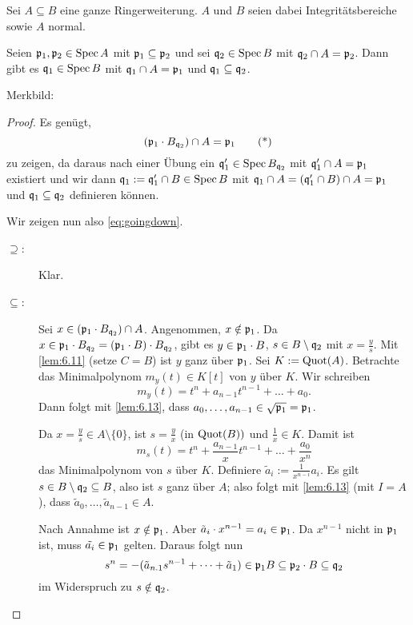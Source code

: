 \documentclass[12pt,a4paper]{scrartcl}
\theoremstyle{cplain}
\theoremstyle{cdef}
\begin{document}
\begin{satz} \label{thm:going down}
	Sei $A\subseteq B$ eine ganze Ringerweiterung. $A$ und $B$ seien dabei Integritätsbereiche sowie $A$ normal.
	
	Seien $\mathfrak{p}_1,\mathfrak{p}_2\in \operatorname{Spec} A$ mit $\mathfrak{p}_1\subseteq \mathfrak{p}_2$ und sei $\mathfrak{q}_2\in\operatorname{Spec} B$ mit $\mathfrak{q}_2\cap A = \mathfrak{p}_2$. Dann gibt es $\mathfrak{q}_1\in\operatorname{Spec} B$ mit $\mathfrak{q}_1\cap A = \mathfrak{p}_1$ und $\mathfrak{q}_1\subseteq \mathfrak{q}_2$.
	
	Merkbild:
	\begin{center}
	\end{center}
\end{satz}
\begin{proof}
	Es genügt, \begin{equation}(\mathfrak{p}_1\cdot B_{\mathfrak{q}_2})\cap A = \mathfrak{p}_1 \tag{*}\label{eq:goingdown}\end{equation} zu zeigen, da daraus nach einer Übung ein $\mathfrak{q}_1' \in \operatorname{Spec} B_{\mathfrak{q}_2}$ mit $\mathfrak{q}_1'\cap A = \mathfrak{p}_1$ existiert und wir dann $\mathfrak{q}_1 := \mathfrak{q}_1'\cap B\in\operatorname{Spec} B$ mit $\mathfrak{q}_1\cap A = (\mathfrak{q}_1'\cap B)\cap A = \mathfrak{p}_1$ und $\mathfrak{q}_1\subseteq \mathfrak{q}_2$ definieren können.
	
	Wir zeigen nun also \eqref{eq:goingdown}.
	\begin{description}
		\item[\glqq$\supseteq$\grqq:] Klar.
		\item[\glqq$\subseteq$\grqq:] Sei $x\in (\mathfrak{p}_1\cdot B_{\mathfrak{q}_2})\cap A$. Angenommen, $x\notin \mathfrak{p}_1$. Da $x\in \mathfrak{p}_1\cdot B_{\mathfrak{q}_2} = (\mathfrak{p}_1\cdot B)\cdot B_{\mathfrak{q}_2}$, gibt es $y\in \mathfrak{p}_1\cdot B$, $s\in B\setminus \mathfrak{q}_2$ mit $x = \frac ys$. Mit \cref{lem:6.11} (setze $C = B$) ist $y$ ganz über $\mathfrak{p}_1$. Sei $K := \operatorname{Quot}(A)$. Betrachte das Minimalpolynom $m_y(t) \in K[t]$ von $y$ über $K$. Wir schreiben 
		\[m_y(t) = t^n+a_{n-1}t^{n-1}+\dots+a_0.\]
		Dann folgt mit \cref{lem:6.13}, dass $a_0,\dots, a_{n-1}\in\sqrt{\mathfrak{p}_1} = \mathfrak{p}_1$.
		
		Da $x = \frac ys\in A\setminus\{0\}$, ist $s = \frac yx$ (in $\operatorname{Quot}(B))$ und $\frac 1x \in K$. Damit ist
		\[m_s(t) = t^n+\frac{a_{n-1}}xt^{n-1}+\dots + \frac {a_0}{x^n}\]
		das Minimalpolynom von $s$ über $K$. Definiere $\tilde{a}_i := \frac{1}{x^{n-i}}a_i$. Es gilt $s\in B\setminus \mathfrak{q}_2\subseteq B$, also ist $s$ ganz über $A$; also folgt mit \cref{lem:6.13} (mit $I = A$), dass $\tilde{a}_0,\dots, \tilde{a}_{n-1}\in A$.
		
		Nach Annahme ist $x\notin \mathfrak{p}_1$. Aber $\tilde{a}_i\cdot x^{n-1} = a_i\in \mathfrak{p}_1$. Da $x^{n-1}$ nicht in $\mathfrak{p}_1$ ist, muss $\tilde{a_i}\in \mathfrak{p}_1$ gelten. Daraus folgt nun
		\[s^n = -(\tilde{a}_{n.1}s^{n-1}+\dots+\tilde{a}_1)\in \mathfrak{p}_1B\subseteq \mathfrak{p}_2\cdot B\subseteq \mathfrak{q}_2\]
		im Widerspruch zu $s\notin \mathfrak{q}_2$.
		\qedhere
	\end{description}
\end{proof}
\end{document}
